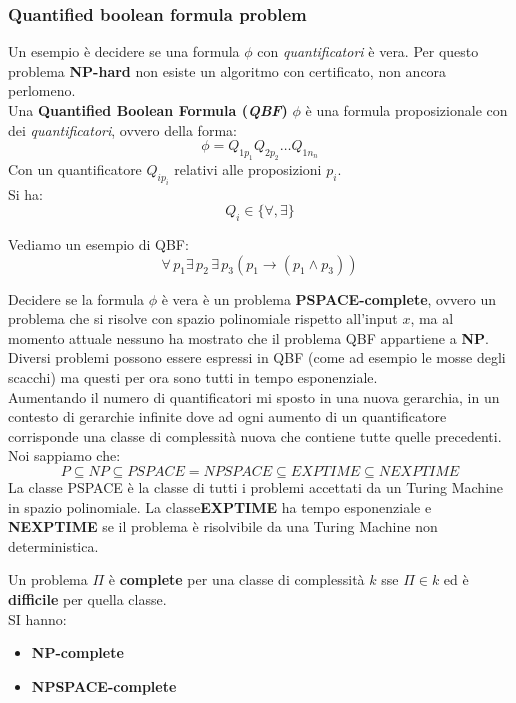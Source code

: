 														\subsubsection{Quantified boolean formula problem}
														Un esempio è decidere se una formula $\phi$ con \textit{quantificatori} è
														vera. Per questo problema \textbf{NP-hard} non esiste un algoritmo con
														certificato, non ancora perlomeno.\\
														Una \textbf{Quantified Boolean Formula (\textit{QBF})} $\phi$ è una formula
														proposizionale con dei \textit{quantificatori}, ovvero della forma:
														\[\phi=Q_{1p_1}Q_{2p_2}\ldots Q_{1n_n}\]
														Con un quantificatore $Q_{ip_i}$ relativi alle proposizioni $p_i$.\\
														Si ha:
														\[Q_i\in\{\forall,\exists\}\]
														\begin{esempio}
															Vediamo un esempio di QBF:
															\[\forall\, p_1\exists\,p_2\,\exists\, p_3(p_1\to(p_1\land p_3))\]
														\end{esempio}
														Decidere se la formula $\phi$ è vera è un problema \textbf{PSPACE-complete},
														ovvero un problema che si risolve con spazio polinomiale rispetto all'input $x$,
														ma al momento attuale nessuno ha mostrato che il problema QBF appartiene a
														\textbf{NP}.\\
														Diversi problemi possono essere espressi in QBF (come ad esempio le mosse degli
														scacchi) ma questi per ora sono tutti in tempo esponenziale.\\
														Aumentando il numero di quantificatori mi sposto in una nuova gerarchia, in un
														contesto di gerarchie infinite dove ad ogni aumento di un quantificatore
														corrisponde una classe di complessità nuova che contiene tutte quelle
														precedenti.\\
														Noi sappiamo che:
														\[P\subseteq NP\subseteq PSPACE=NPSPACE\subseteq EXPTIME\subseteq NEXPTIME\]
														La classe PSPACE è la classe di tutti i problemi accettati da un Turing Machine
														in spazio polinomiale. La classe\textbf{EXPTIME} ha tempo esponenziale e
														\textbf{NEXPTIME} se il problema è risolvibile da una Turing Machine non
														deterministica.
														\begin{definizione}
															Un problema $\Pi$ è \textbf{complete} per una classe di complessità $k$ sse 
															$\Pi\in k$ ed è \textbf{difficile} per quella classe.\\
															SI hanno:
															\begin{itemize}
																\item \textbf{NP-complete}
																\item \textbf{NPSPACE-complete}
															\end{itemize}
														\end{definizione}
